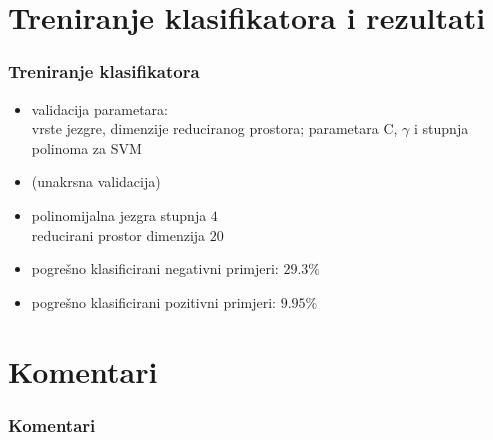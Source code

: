 \documentclass{beamer}
\begin{document}
\section{Treniranje klasifikatora i rezultati} 
\begin{frame}
\frametitle{Treniranje klasifikatora}
\begin{itemize}
\item{validacija parametara: \\ vrste jezgre, dimenzije reduciranog prostora; parametara C, $\gamma$ i stupnja polinoma za SVM}
\item{(unakrsna validacija)}
\item{polinomijalna jezgra stupnja $4$\\ reducirani prostor dimenzija $20$}
\item{pogrešno klasificirani negativni primjeri: $29.3\%$}
\item{pogrešno klasificirani pozitivni primjeri: $9.95\%$}
\end{itemize}
\end{frame}

\section{Komentari}
\begin{frame}
\frametitle{Komentari}
\end{frame}

\begin{frame}
\small


\end{frame}
\end{document}
